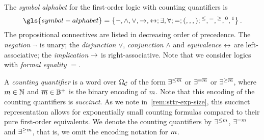 
The \emph{symbol alphabet} for the first-order logic with counting quantifiers
is
\[
  \gls{symbol-alphabet} = \set{\lnot, \allconns; \allQs;
  =; (,,,); {}^{\leq}, {}^{=}, {}^{\geq}, {}^0, {}^1}.
\]
The propositional connectives are listed in decreasing order of precedence.
The \emph{negation} $\lnot$ is unary;
the \emph{disjunction} $\lor$, \emph{conjunction} $\land$ and \emph{equivalence}
$\leftrightarrow$ are left-associative; the \emph{implication} $\rightarrow$ is
right-associative.
Note that we consider logics with \emph{formal equality} $=$.

A \emph{counting quantifier} is a word over $\Omega_{\mathcal{C}}$ of the form
$\exists^{\leq\overline{m}}$ or $\exists^{=\overline{m}}$ or $\exists^{\geq\overline{m}}$,
where $m \in \mathbb{N}$ and $\overline{m} \in \mathbb{B}^+$ is the binary encoding of
$m$. Note that this encoding of the counting quantifiers is \emph{succinct}.
As we note in~\cref{rem:sttr-exp-size}, this succinct representation allows for
exponentially small counting formulas compared to their pure first-order
equivalents.
We denote the counting quantifiers by $\exists^{\leq m}$, $\exists^{=m}$ and
$\exists^{\geq m}$, that is, we omit the encoding notation for $m$.